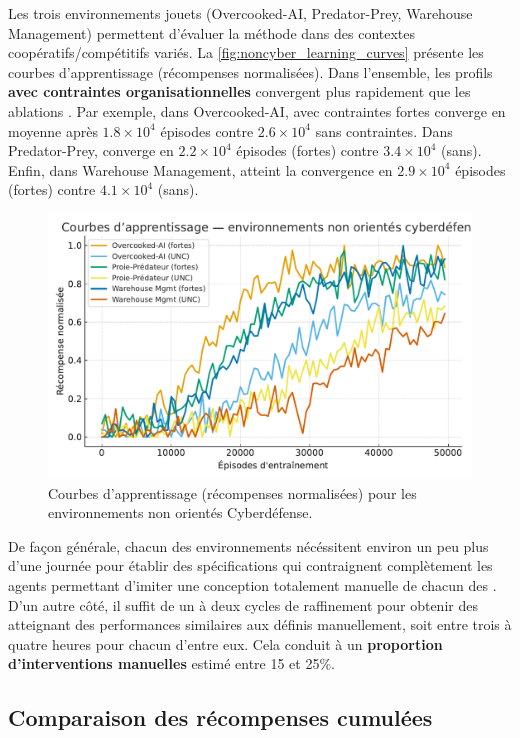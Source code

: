 Les trois environnements jouets (Overcooked-AI, Predator-Prey, Warehouse Management) permettent d'évaluer la méthode  dans des contextes coopératifs/compétitifs variés.
La \autoref{fig:noncyber_learning_curves} présente les courbes d'apprentissage (récompenses normalisées).
Dans l'ensemble, les profils \textbf{avec contraintes organisationnelles} convergent plus rapidement que les ablations .
Par exemple, dans Overcooked-AI,  avec contraintes fortes converge en moyenne après $1.8\times 10^4$ épisodes contre $2.6\times 10^4$ sans contraintes.
Dans Predator-Prey,  converge en $2.2\times 10^4$ épisodes (fortes) contre $3.4\times 10^4$ (sans).
Enfin, dans Warehouse Management,  atteint la convergence en $2.9\times 10^4$ épisodes (fortes) contre $4.1\times 10^4$ (sans).

\begin{figure}[h!]
  \centering
  \includegraphics[width=0.75\linewidth]{figures/results_noncyber_learning.pdf}
  \caption{Courbes d'apprentissage (récompenses normalisées) pour les environnements non orientés Cyberdéfense.}
  \label{fig:noncyber_learning_curves}
\end{figure}

De façon générale, chacun des environnements nécéssitent environ un peu plus d'une journée pour établir des spécifications qui contraignent complètement les agents permettant d'imiter une conception totalement manuelle de chacun des . D'un autre côté, il suffit de un à deux cycles de raffinement pour obtenir des  atteignant des performances similaires aux  définis manuellement, soit entre trois à quatre heures pour chacun d'entre eux. Cela conduit à un \textbf{proportion d'interventions manuelles} estimé entre 15 et 25\%.


\subsection*{Comparaison des récompenses cumulées}

